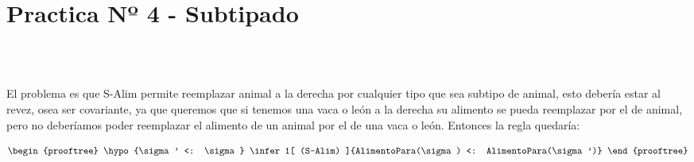 \chapter{Practica Nº 4 - Subtipado}

 \\

\begin{solucion*}
\begin{center}
\end{center}

\hfill\\


 El problema es que S-Alim permite reemplazar animal a la derecha por
cualquier tipo que sea subtipo de animal, esto debería estar al revez, osea ser
covariante, ya que queremos que si tenemos una vaca o león a la derecha su
alimento se pueda reemplazar por el de animal, pero no deberíamos poder
reemplazar el alimento de un animal por el de una vaca o león. Entonces la regla
quedaría:

\[
\begin{prooftree}
    \hypo{\sigma' <: \sigma}
    \infer1[ (S-Alim) ]{AlimentoPara(\sigma) <: AlimentoPara(\sigma')}
\end{prooftree}
\]
\end{solucion*}
